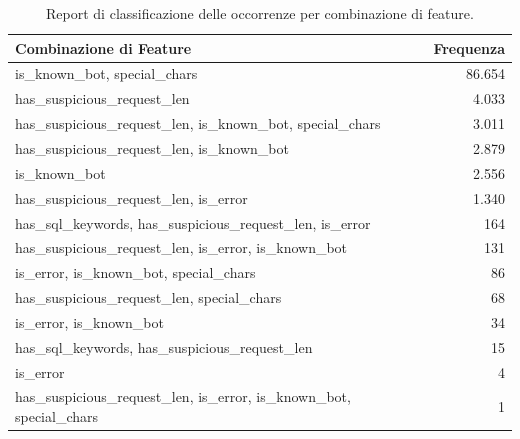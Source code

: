 \begin{table}[H]
      \centering
      \begin{tabular}{|l|r|}
            \hline
            \textbf{Combinazione di Feature}                                         & \textbf{Frequenza} \\
            \hline
            is\_known\_bot, special\_chars                                           & 86.654             \\
            has\_suspicious\_request\_len                                            & 4.033              \\
            has\_suspicious\_request\_len, is\_known\_bot, special\_chars            & 3.011              \\
            has\_suspicious\_request\_len, is\_known\_bot                            & 2.879              \\
            is\_known\_bot                                                           & 2.556              \\
            has\_suspicious\_request\_len, is\_error                                 & 1.340              \\
            has\_sql\_keywords, has\_suspicious\_request\_len, is\_error             & 164                \\
            has\_suspicious\_request\_len, is\_error, is\_known\_bot                 & 131                \\
            is\_error, is\_known\_bot, special\_chars                                & 86                 \\
            has\_suspicious\_request\_len, special\_chars                            & 68                 \\
            is\_error, is\_known\_bot                                                & 34                 \\
            has\_sql\_keywords, has\_suspicious\_request\_len                        & 15                 \\
            is\_error                                                                & 4                  \\
            has\_suspicious\_request\_len, is\_error, is\_known\_bot, special\_chars & 1                  \\
            \hline
      \end{tabular}
      \label{table:comboFeat}
      \caption{Report di classificazione delle occorrenze per combinazione di feature.}
\end{table}

